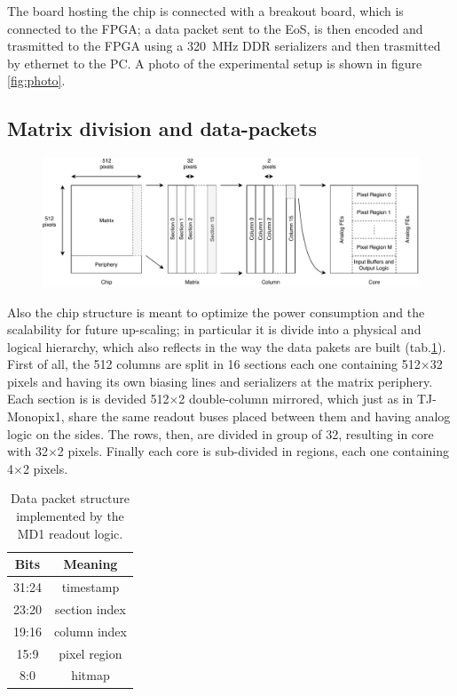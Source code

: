     The board hosting the chip is connected with a breakout board, which is connected to the FPGA; a data packet sent to the EoS, is then encoded and trasmitted to the FPGA using a \SI{320}{MHz} DDR serializers and then trasmitted by ethernet to the PC.
    A photo of the experimental setup is shown in figure \ref{fig:photo}.

    \subsection{Matrix division and data-packets}
        \begin{figure}[h!]
            \centering
            \includegraphics[width=.98\linewidth]{figures/ARCADIA/hierarchy.pdf}
            \caption{}
            \label{fig:hierarchy}
        \end{figure}
        Also the chip structure is meant to optimize the power consumption and the scalability for future up-scaling; in particular it is divide into a physical and logical hierarchy, which also reflects in the way the data pakets are built (tab.\ref{tab:data_packet}).
        First of all, the 512 columns are split in 16 sections each one containing 512$\times$32 pixels and having its own biasing lines and serializers at the matrix periphery. 
        Each section is is devided 512$\times$2 double-column mirrored, which just as in TJ-Monopix1, share the same readout buses placed between them and having analog logic on the sides.        
        The rows, then, are divided in group of 32, resulting in core with 32$\times$2 pixels. Finally each core is sub-divided in regions, each one containing 4$\times$2 pixels. 
        \begin{table}
            \begin{center}
            \begin{tabular}{|c |c |}
            \hline
            Bits & Meaning  \\
            \hline
            \hline
            31:24 & timestamp\\
            23:20 & section index\\
            19:16 & column index\\
            15:9 & pixel region\\
            8:0 & hitmap\\
            \hline
            \end{tabular}
            \caption{Data packet structure implemented by the MD1 readout logic.}
            \label{tab:data_packet}
            \end{center}
        \end{table}

